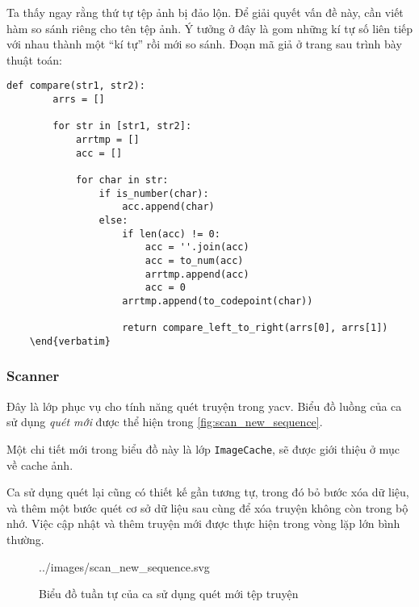 \documentclass[../../../../thesis]{subfiles}
\begin{document}
Ta thấy ngay rằng thứ tự tệp ảnh bị đảo lộn. Để giải quyết vấn đề này, cần viết
hàm so sánh riêng cho tên tệp ảnh. Ý tưởng ở đây là gom những kí tự số liên tiếp
với nhau thành một ``kí tự'' rồi mới so sánh. Đoạn mã giả ở trang sau trình bày
thuật toán:

\begin{Verbatim}[samepage=true]
    def compare(str1, str2):
        arrs = []

        for str in [str1, str2]:
            arrtmp = []
            acc = []

            for char in str:
                if is_number(char):
                    acc.append(char)
                else:
                    if len(acc) != 0:
                        acc = ''.join(acc)
                        acc = to_num(acc)
                        arrtmp.append(acc)
                        acc = 0
                    arrtmp.append(to_codepoint(char))

                    return compare_left_to_right(arrs[0], arrs[1])
    \end{verbatim}
\end{Verbatim}



\subsubsection{Scanner}

Đây là lớp phục vụ cho tính năng quét truyện trong yacv. Biểu đồ luồng của ca sử
dụng \emph{quét mới} được thể hiện trong \autoref{fig:scan_new_sequence}.

Một chi tiết mới trong biểu đồ này là lớp \texttt{ImageCache}, sẽ được giới
thiệu ở mục về cache ảnh.

Ca sử dụng quét lại cũng có thiết kế gần tương tự, trong đó bỏ bước xóa dữ liệu,
và thêm một bước quét cơ sở dữ liệu sau cùng để xóa truyện không còn trong bộ
nhớ. Việc cập nhật và thêm truyện mới được thực hiện trong vòng lặp lớn bình
thường.

\begin{figure}[H]
    \centering
    
        {../images/scan_new_sequence.svg}
    \caption{Biểu đồ tuần tự của ca sử dụng quét mới tệp truyện}
    \label{fig:scan_new_sequence}
\end{figure}
\end{document}
